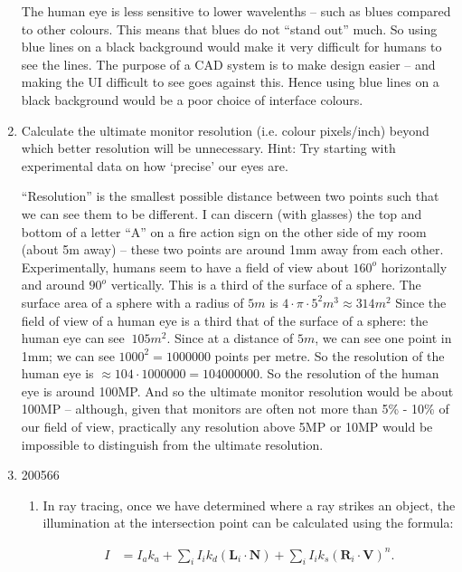 \documentclass[10pt,\jkfside,a4paper]{article}
\begin{document}
\begin{enumerate}[label=(\alph*)]
The human eye is less sensitive to lower wavelenths -- such as blues compared to other colours. 
This means that blues do not ``stand out'' much. So using blue lines on a black background would 
make it very difficult for humans to see the lines. The purpose of a CAD system is to make design 
easier -- and making the UI difficult to see goes against this. Hence using blue lines on a black 
background would be a poor choice of interface colours.

\item Calculate the ultimate monitor resolution (i.e. colour pixels/inch) beyond which 
better resolution will be unnecessary. Hint: Try starting with experimental data on how 
`precise' our eyes are.

``Resolution'' is the smallest possible distance between two points such that we can see them to be different. 
I can discern (with glasses) the top and bottom of a letter ``A'' on a fire action sign on the other 
side of my room (about 5m away) -- these two points are around 1mm away from each other. Experimentally, humans 
seem to have a field of view about $160^o$ horizontally and around $90^o$ vertically. This is a third of the 
surface of a sphere. The surface area of a sphere with a radius of $5m$ is $4\cdot \pi \cdot 5^2m^3 \approx 314m^2$ 
Since the field of view of a human eye is a third that of the surface of a sphere: the human eye can see $~105m^2$. 
Since at a distance of $5m$, we can see one point in 1mm; we can see $1000^2 = 1000 000$ points per metre. So the 
resolution of the human eye is $\approx 104 \cdot 1000 000 = 104 000 000$. So the resolution of the human eye is 
around 100MP. And so the ultimate monitor resolution would be about 100MP -- although, given that monitors are often 
not more than 5\% - 10\% of our field of view, practically any resolution above 5MP or 10MP would be impossible to 
distinguish from the ultimate resolution.

\item \begin{examquestion}{2005}{6}{6}

\begin{enumerate}[label=(\alph*)]

\item  In ray tracing, once we have determined where a ray strikes an object, the
illumination at the intersection point can be calculated using the formula:

\begin{equation}
\begin{split}
I &= I_ak_a+\sum_{i}I_ik_d(\mathbf{L}_i\cdot \mathbf{N}) + \sum_{i}I_ik_s(\mathbf{R}_i\cdot \mathbf{V})^n.\\
\end{split}
\end{equation}


\end{enumerate}
\end{examquestion}
\end{enumerate}
\end{document}
